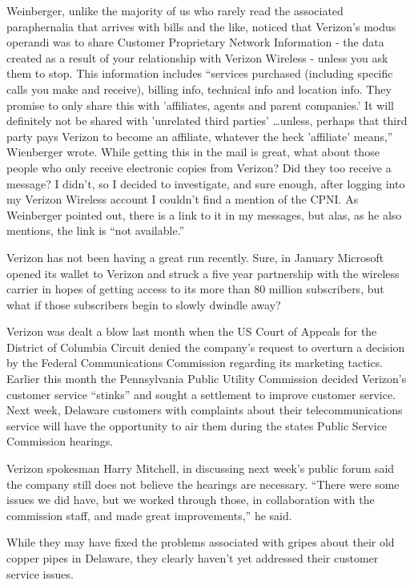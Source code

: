\documentclass[12pt,a4paper,onecolumn]{article}
\begin{document}
\begin{CJK*}{GBK}{song}
Weinberger, unlike the majority of us who rarely read the associated paraphernalia that arrives with
bills and the like, noticed that Verizon's modus operandi was to share Customer Proprietary Network
Information - the data created as a result of your relationship with Verizon Wireless - unless you
ask them to stop. This information includes ``services purchased (including specific calls you make
and receive), billing info, technical info and location info. They promise to only share this with
'affiliates, agents and parent companies.' It will definitely not be shared with 'unrelated third
parties' \ldots unless, perhaps that third party pays Verizon to become an affiliate, whatever the
heck 'affiliate' means,'' Wienberger wrote. While getting this in the mail is great, what about
those people who only receive electronic copies from Verizon? Did they too receive a message? I
didn't, so I decided to investigate, and sure enough, after logging into my Verizon Wireless account
I couldn't find a mention of the CPNI. As Weinberger pointed out, there is a link to it in my
messages, but alas, as he also mentions, the link is ``not available.''

Verizon has not been having a great run recently. Sure, in January Microsoft opened its wallet to
Verizon and struck a five year partnership with the wireless carrier in hopes of getting access to
its more than 80 million subscribers, but what if those subscribers begin to slowly dwindle away?

Verizon was dealt a blow last month when the US Court of Appeals for the District of Columbia
Circuit denied the company's request to overturn a decision by the Federal Communications Commission
regarding its marketing tactics. Earlier this month the Pennsylvania Public Utility Commission
decided Verizon's customer service ``stinks'' and sought a settlement to improve customer service.
Next week, Delaware customers with complaints about their telecommunications service will have the
opportunity to air them during the states Public Service Commission hearings.

Verizon spokesman Harry Mitchell, in discussing next week's public forum said the company still does
not believe the hearings are necessary. ``There were some issues we did have, but we worked through
those, in collaboration with the commission staff, and made great improvements,'' he said.

While they may have fixed the problems associated with gripes about their old copper pipes in
Delaware, they clearly haven't yet addressed their customer service issues.


\end{CJK*}
\end{document}
